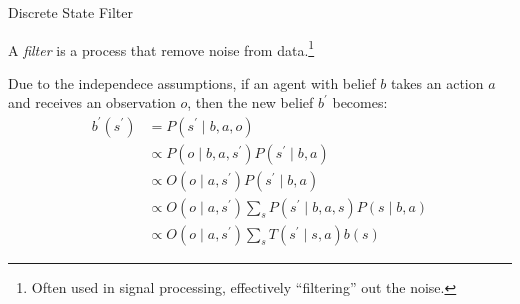 \begin{frame}[fragile]{Discrete State Filter}

A \textit{filter} is a process that remove noise from data.\footnote{Often used in signal processing, effectively ``filtering'' out the noise.}

\vspace{5mm}

Due to the independece assumptions, if an agent with belief $b$ takes an action $a$ and receives an observation $o$, then the new belief $b^\prime$ becomes:
\begin{align*}
    b^\prime(s^\prime) &= P(s^\prime \mid b, a, o)\\
                       &\propto P(o \mid b, a, s^\prime) P(s^\prime \mid b, a) \tag{Bayes' rule}\\
                       &\propto O(o \mid a, s^\prime) P(s^\prime \mid b, a)\tag{observation definition}\\
                       &\propto O(o \mid a, s^\prime) \sum_s P(s^\prime \mid b, a, s) P(s \mid b, a) \tag{law of total probability}\\
                       &\propto O(o \mid a, s^\prime)\sum_s T(s^\prime \mid s, a)b(s) \tag{state transition model}
\end{align*}


\end{frame}
